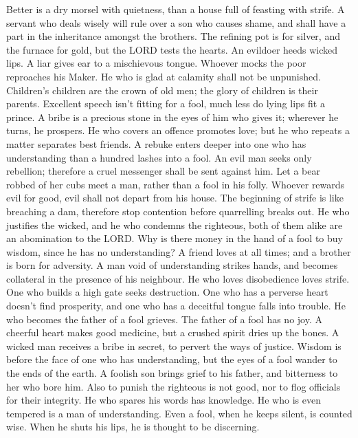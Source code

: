  Better is a dry morsel with quietness, than a house full of
feasting with strife.  A servant who deals wisely will rule
over a son who causes shame, and shall have a part in the inheritance
amongst the brothers.  The refining pot is for silver, and
the furnace for gold, but the LORD tests the hearts.  An
evildoer heeds wicked lips. A liar gives ear to a mischievous tongue.
 Whoever mocks the poor reproaches his Maker. He who is glad
at calamity shall not be unpunished.  Children's children
are the crown of old men; the glory of children is their parents.
 Excellent speech isn't fitting for a fool, much less do
lying lips fit a prince.  A bribe is a precious stone in the
eyes of him who gives it; wherever he turns, he prospers. 
He who covers an offence promotes love; but he who repeats a matter
separates best friends.  A rebuke enters deeper into one
who has understanding than a hundred lashes into a fool. 
An evil man seeks only rebellion; therefore a cruel messenger shall be
sent against him.  Let a bear robbed of her cubs meet a
man, rather than a fool in his folly.  Whoever rewards evil
for good, evil shall not depart from his house.  The
beginning of strife is like breaching a dam, therefore stop contention
before quarrelling breaks out.  He who justifies the
wicked, and he who condemns the righteous, both of them alike are an
abomination to the LORD.  Why is there money in the hand of
a fool to buy wisdom, since he has no understanding?  A
friend loves at all times; and a brother is born for adversity.
 A man void of understanding strikes hands, and becomes
collateral in the presence of his neighbour.  He who loves
disobedience loves strife. One who builds a high gate seeks destruction.
 One who has a perverse heart doesn't find prosperity, and
one who has a deceitful tongue falls into trouble.  He who
becomes the father of a fool grieves. The father of a fool has no joy.
 A cheerful heart makes good medicine, but a crushed spirit
dries up the bones.  A wicked man receives a bribe in
secret, to pervert the ways of justice.  Wisdom is before
the face of one who has understanding, but the eyes of a fool wander to
the ends of the earth.  A foolish son brings grief to his
father, and bitterness to her who bore him.  Also to punish
the righteous is not good, nor to flog officials for their integrity.
 He who spares his words has knowledge. He who is even
tempered is a man of understanding.  Even a fool, when he
keeps silent, is counted wise. When he shuts his lips, he is thought to
be discerning.

